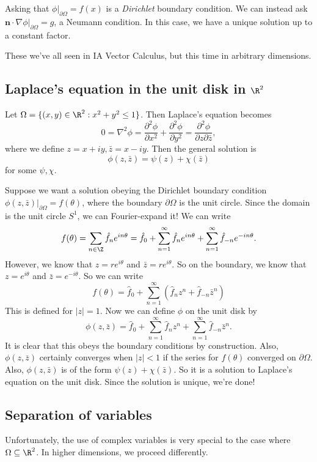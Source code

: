\documentclass[a4paper]{article}
\begin{document}
Asking that $\phi|_{\partial \Omega} = f(x)$ is a \emph{Dirichlet} boundary condition. We can instead ask $\mathbf{n}\cdot \nabla \phi|_{\partial \Omega} = g$, a Neumann condition. In this case, we have a unique solution up to a constant factor.

These we've all seen in IA Vector Calculus, but this time in arbitrary dimensions.

\subsection{Laplace's equation in the unit disk in \texorpdfstring{$\R^2$}{R2}}
Let $\Omega = \{(x, y) \in \R^2: x^2 + y^2 \leq 1\}$.  Then Laplace's equation becomes
\[
  0 = \nabla^2 \phi = \frac{\partial^2 \phi}{\partial x^2} + \frac{\partial^2 \phi}{\partial y^2} = \frac{\partial^2 \phi}{\partial z \partial \bar{z}},
\]
where we define $z = x + iy, \bar z = x - iy$. Then the general solution is
\[
  \phi(z, \bar z) = \psi(z) + \chi(\bar z)
\]
for some $\psi, \chi$.

Suppose we want a solution obeying the Dirichlet boundary condition $\phi(z, \bar z) |_{\partial \Omega} = f(\theta)$, where the boundary $\partial \Omega$ is the unit circle. Since the domain is the unit circle $S^1$, we can Fourier-expand it! We can write
\[
  f(\theta) = \sum_{n \in \Z}\hat{f}_n e^{in\theta} = \hat{f}_0 + \sum_{n = 1}^\infty \hat{f}_n e^{in\theta} + \sum_{n = 1}^\infty \hat{f}_{-n} e^{-in\theta}.
\]
However, we know that $z = re^{i\theta}$ and $\bar{z} = re^{i\theta}$. So on the boundary, we know that $z = e^{i\theta}$ and $\bar z = e^{-i\theta}$. So we can write
\[
  f(\theta) = \hat{f}_0 + \sum_{n = 1}^\infty (\hat{f}_n z^n + \hat{f}_{-n}\bar{z}^n)
\]
This is defined for $|z| = 1$. Now we can define $\phi$ on the unit disk by
\[
  \phi(z, \bar z) = \hat{f}_0 + \sum_{n = 1}^\infty \hat{f}_n z^n + \sum_{n = 1}^\infty \hat{f}_{-n}\bar{z}^n.
\]
It is clear that this obeys the boundary conditions by construction. Also, $\phi(z, \bar{z})$ certainly converges when $|z| < 1$ if the series for $f(\theta)$ converged on $\partial \Omega$. Also, $\phi(z, \bar z)$ is of the form $\psi(z) + \chi(\bar z)$. So it is a solution to Laplace's equation on the unit disk. Since the solution is unique, we're done!

\subsection{Separation of variables}
Unfortunately, the use of complex variables is very special to the case where $\Omega \subseteq \R^2$. In higher dimensions, we proceed differently.
\end{document}
